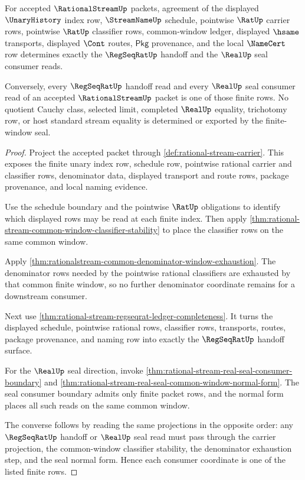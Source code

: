 \begin{theorem}\label{thm:rational-stream-finite-window-seal-determinacy}
For accepted $\RationalStreamUp$ packets, agreement of the displayed
$\UnaryHistory$ index row, $\StreamNameUp$ schedule, pointwise $\RatUp$
carrier rows, pointwise $\RatUp$ classifier rows, common-window ledger,
displayed $\hsame$ transports, displayed $\Cont$ routes, $\mathsf{Pkg}$
provenance, and the local $\NameCert$ row determines exactly the
$\RegSeqRatUp$ handoff and the $\RealUp$ seal consumer reads.

Conversely, every $\RegSeqRatUp$ handoff read and every $\RealUp$ seal
consumer read of an accepted $\RationalStreamUp$ packet is one of those finite
rows. No quotient Cauchy class, selected limit, completed $\RealUp$ equality,
trichotomy row, or host standard stream equality is determined or exported by
the finite-window seal.
\end{theorem}
\begin{proof}
Project the accepted packet through \autoref{def:rational-stream-carrier}.
This exposes the finite unary index row, schedule row, pointwise rational
carrier and classifier rows, denominator data, displayed transport and route
rows, package provenance, and local naming evidence.

Use the schedule boundary and the pointwise $\RatUp$ obligations to identify
which displayed rows may be read at each finite index. Then apply
\autoref{thm:rational-stream-common-window-classifier-stability} to place the
classifier rows on the same common window.

Apply \autoref{thm:rationalstream-common-denominator-window-exhaustion}. The
denominator rows needed by the pointwise rational classifiers are exhausted by
that common finite window, so no further denominator coordinate remains for a
downstream consumer.

Next use \autoref{thm:rational-stream-regseqrat-ledger-completeness}. It
turns the displayed schedule, pointwise rational rows, classifier rows,
transports, routes, package provenance, and naming row into exactly the
$\RegSeqRatUp$ handoff surface.

For the $\RealUp$ seal direction, invoke
\autoref{thm:rational-stream-real-seal-consumer-boundary} and
\autoref{thm:rational-stream-real-seal-common-window-normal-form}. The seal
consumer boundary admits only finite packet rows, and the normal form places
all such reads on the same common window.

The converse follows by reading the same projections in the opposite order:
any $\RegSeqRatUp$ handoff or $\RealUp$ seal read must pass through the carrier
projection, the common-window classifier stability, the denominator exhaustion
step, and the seal normal form. Hence each consumer coordinate is one of the
listed finite rows.
\end{proof}

